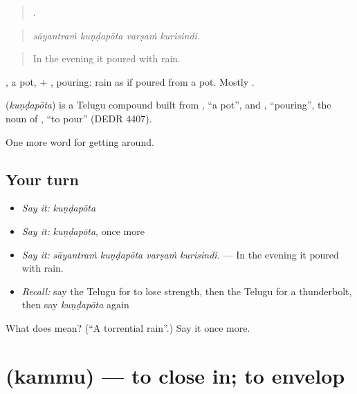 \begin{quote}
   .
\end{quote}

\begin{quote}
\emph{sāyantraṁ kuṇḍapōta varṣaṁ kurisindi.}
\end{quote}

\begin{quote}
In the evening it poured with rain.
\end{quote}

, a pot, + , pouring: rain as if poured from a pot. Mostly  .

\begin{cousinweb}
\textbf{} (\emph{kuṇḍapōta}) is a Telugu compound built from , \textquotedblleft{}a pot\textquotedblright{}, and , \textquotedblleft{}pouring\textquotedblright{}, the noun of , \textquotedblleft{}to pour\textquotedblright{} (DEDR 4407).
\end{cousinweb}

\begin{grammarlens}[title={What you've built}]
One more word for getting around.
\end{grammarlens}

\subsection*{Your turn}
\begin{itemize}
\raggedright
  \item \emph{Say it:} \emph{kuṇḍapōta}
  \item \emph{Say it:} \emph{kuṇḍapōta}, once more
  \item \emph{Say it:} \emph{sāyantraṁ kuṇḍapōta varṣaṁ kurisindi.} — In the evening it poured with rain.
  \item \emph{Recall:} say the Telugu for to lose strength, then the Telugu for a thunderbolt, then say \emph{kuṇḍapōta} again
\end{itemize}

\begin{tcolorbox}[breakable,colback=teal!4,colframe=teal!35!black,title={Before you move on}]
What does  mean? (\textquotedblleft{}A torrential rain\textquotedblright{}.) Say it once more.
\end{tcolorbox}
\section[\texorpdfstring{\te{కమ్ము} (kammu)}{కమ్ము (kammu)}]{ (kammu) — to close in; to envelop}

